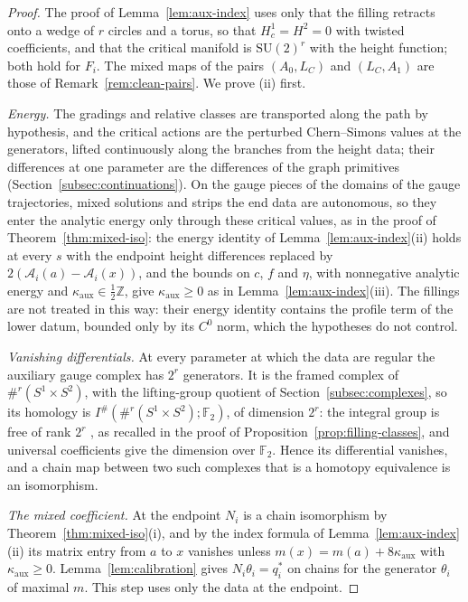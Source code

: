 \documentclass[11pt]{amsart}
\theoremstyle{definition}
\theoremstyle{remark}
\theoremstyle{plain}
\numberwithin{equation}{section}
\newcommand{\ZZ}{\mathbb{Z}}
\newcommand{\FF}{\mathbb{F}_2}
\newcommand{\SU}{\mathrm{SU}}
\newcommand{\Ish}{I^{\#}}
\begin{document}
\begin{proof}
The proof of Lemma~\ref{lem:aux-index} uses only that the filling retracts
onto a wedge of $r$ circles and a torus, so that $H^1_c=H^2=0$ with twisted
coefficients, and that the critical manifold is $\SU(2)^r$ with the height
function; both hold for $F_i$. The mixed maps of the pairs $(A_0,L_C)$ and $(L_C,A_1)$ are those
of Remark~\ref{rem:clean-pairs}. We prove (ii) first.

\emph{Energy.} The gradings and relative classes are transported along the path by hypothesis,
and the critical actions are the perturbed Chern--Simons values at the generators, lifted
continuously along the branches from the height data; their differences at one parameter are
the differences of the graph primitives (Section~\ref{subsec:continuations}). On the gauge
pieces of the domains of the gauge trajectories, mixed solutions and strips the end data are
autonomous, so they enter the analytic energy only through these critical values, as in the
proof of Theorem~\ref{thm:mixed-iso}: the energy identity of Lemma~\ref{lem:aux-index}(ii)
holds at every $s$ with the endpoint height differences replaced by
$2(\mathcal A_i(a)-\mathcal A_i(x))$, and the bounds on $c$, $f$ and $\eta$, with nonnegative
analytic energy and $\kappa_{\mathrm{aux}}\in\frac12\ZZ$, give $\kappa_{\mathrm{aux}}\ge0$ as in
Lemma~\ref{lem:aux-index}(iii). The fillings are not treated in this way: their energy identity
contains the profile term of the lower datum, bounded only by its $C^0$ norm, which the
hypotheses do not control.

\emph{Vanishing differentials.} At every parameter at which the data are regular the auxiliary
gauge complex has $2^r$ generators. It is the framed complex of $\#^r(S^1\times S^2)$, with the
lifting-group quotient of Section~\ref{subsec:complexes}, so its homology is
$\Ish(\#^r(S^1\times S^2);\FF)$, of dimension $2^r$: the integral group is free of rank $2^r$
\cite[Sections~7.7--7.8]{Scaduto}, as recalled in the proof of
Proposition~\ref{prop:filling-classes}, and universal coefficients give the dimension over
$\FF$. Hence its differential vanishes, and a chain map between two such complexes that is a
homotopy equivalence is an isomorphism.

\emph{The mixed coefficient.} At the endpoint $N_i$ is a chain isomorphism by
Theorem~\ref{thm:mixed-iso}(i), and by the index formula of Lemma~\ref{lem:aux-index}(ii) its
matrix entry from $a$ to $x$ vanishes unless $m(x)=m(a)+8\kappa_{\mathrm{aux}}$ with
$\kappa_{\mathrm{aux}}\ge0$. Lemma~\ref{lem:calibration} gives $N_i\theta_i=q_i^*$ on chains
for the generator $\theta_i$ of maximal $m$. This step uses only the data at the endpoint.


\end{proof}
\end{document}

